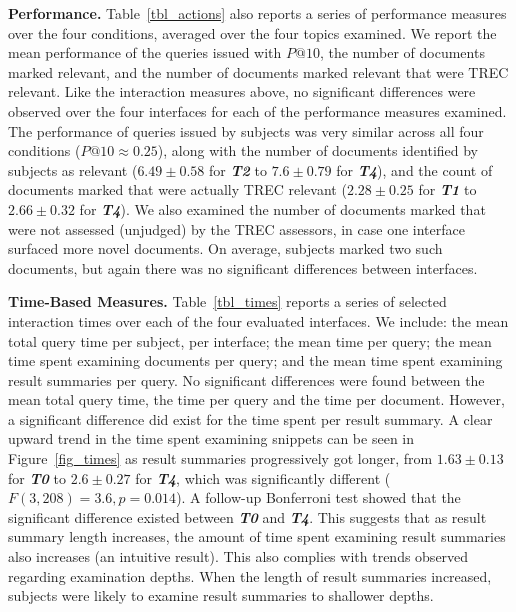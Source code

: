 \vspace{2mm}
\noindent\textbf{Performance.} Table~\ref{tbl_actions} also reports a series of performance measures over the four conditions, averaged over the four topics examined. We report the mean performance of the queries issued with $P@10$, the number of documents marked relevant, and the number of documents marked relevant that were TREC relevant. Like the interaction measures above, no significant differences were observed over the four interfaces for each of the performance measures examined. The performance of queries issued by subjects was very similar across all four conditions ($P@10\approx0.25$), along with the number of documents identified by subjects as relevant ($6.49\pm0.58$ for \textbf{\emph{T2}} to $7.6\pm0.79$ for \textbf{\emph{T4}}), and the count of documents marked that were actually TREC relevant ($2.28\pm0.25$ for \textbf{\emph{T1}} to $2.66\pm0.32$ for \textbf{\emph{T4}}). We also examined the number of documents marked that were not assessed (unjudged) by the TREC assessors, in case one interface surfaced more novel documents. On average, subjects marked two such documents, but again there was no significant differences between interfaces.

\vspace{2mm}
\noindent\textbf{Time-Based Measures.} Table~\ref{tbl_times} reports a series of selected interaction times over each of the four evaluated interfaces. We include: the mean total query time per subject, per interface; the mean time per query; the mean time spent examining documents per query; and the mean time spent examining result summaries per query. No significant differences were found between the mean total query time, the time per query and the time per document. However, a significant difference did exist for the time spent per result summary. A clear upward trend in the time spent examining snippets can be seen in Figure~\ref{fig_times} as result summaries progressively got longer, from $1.63\pm0.13$ for \textbf{\emph{T0}} to $2.6\pm0.27$ for \textbf{\emph{T4}}, which was significantly different ($F(3,208)=3.6, p=0.014$). A follow-up Bonferroni test showed that the significant difference existed between \textbf{\emph{T0}} and \textbf{\emph{T4}}. This suggests that as result summary length increases, the amount of time spent examining result summaries also increases (an intuitive result). This also complies with trends observed regarding examination depths. When the length of result summaries increased, subjects were likely to examine result summaries to shallower depths.


